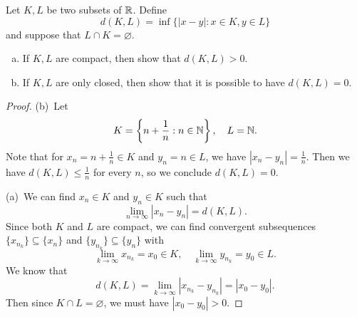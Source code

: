 \begin{exercise}
  Let $K, L$ be two subsets of $\mathbb{R}$. Define
  \[
    d(K, L) = \inf\{|x - y| : x \in K, y \in L\}
  \]
  and suppose that $L \cap K = \varnothing$.
  \begin{enumerate}[(a)]
    \item If $K, L$ are compact, then show that
      $d(K, L) > 0$.
    \item If $K, L$ are only closed, then show that it is
      possible to have $d(K, L) = 0$.
  \end{enumerate}
\end{exercise}

\begin{proof}
  (b)\, Let
  \[K = \left\{n + \frac{1}{n} : n \in \mathbb{N}\right\}, \quad L = \mathbb{N}.\]
  Note that for $x_n = n + \frac{1}{n} \in K$ and $y_n = n \in L$, we have $|x_n - y_n| = \frac{1}{n}$. Then
  we have
  $d(K, L) \le \frac{1}{n}$
  for every $n$, so we conclude $d(K, L) = 0$.

  (a)\, We can find $x_n \in K$ and $y_n \in K$ such that
  \[\lim_{n \to \infty} |x_n - y_n| = d(K, L).\]
  Since both $K$ and $L$ are compact, we can find
  convergent subsequences $\{x_{n_k}\} \subseteq \{x_n\}$
  and $\{y_{n_k}\} \subseteq \{y_n\}$ with
  \[
    \lim_{k \to \infty} x_{n_k} = x_0 \in K, \quad
    \lim_{k \to \infty} y_{n_k} = y_0 \in L.
  \]
  We know that
  \[d(K, L) = \lim_{k \to \infty} |x_{n_k} - y_{n_k}| = |x_0 - y_0|.\]
  Then since $K \cap L = \varnothing$, we must have
  $|x_0 - y_0| > 0$.
\end{proof}

